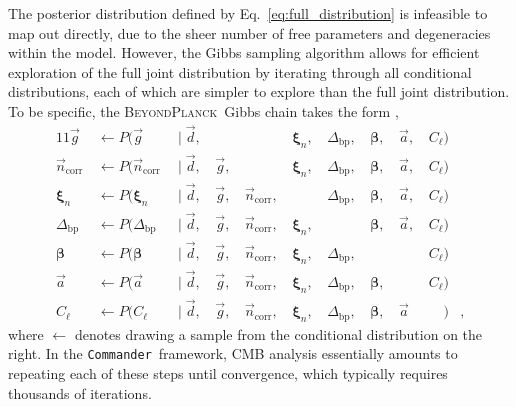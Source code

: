 \documentclass[twocolumn]{aa}
\def\commander{\texttt{Commander}}
\renewcommand{\d}[0]{\vec{d}}
\renewcommand{\a}[0]{\vec{a}}
\newcommand{\g}[0]{\vec{g}}
\newcommand{\BP}{\textsc{BeyondPlanck}}
\newcommand{\ncorr}{\vec n_\mathrm{corr}}
\newcommand{\Dbp}{\Delta_\mathrm{bp}}
\begin{document}
The posterior distribution defined by Eq.~\eqref{eq:full_distribution} is
infeasible to map out directly, due to the sheer number of free parameters and
degeneracies within the model. However, the Gibbs sampling algorithm
\citep{gelman:1992} allows for efficient exploration of the full joint
distribution by iterating through all conditional distributions, each of
which are simpler to explore than the full joint distribution. To be specific,
the \BP\ Gibbs chain takes the form \citep{bp01},
\begin{alignat}{11}
\label{eq:gain_samp_dist}\g &\,\leftarrow          P(\g&\,               \mid \d, &\,    &          &\,\boldsymbol\xi_n,  &\,\Dbp, &\,\boldsymbol\beta, &\,\a, &\,C_{\ell})\\
\label{eq:ncorr_samp_dist} \ncorr &\,\leftarrow    P(\ncorr&\,           \mid \d, &\,\g, &\,        &\,\boldsymbol\xi_n,  &\,\Dbp, &\,\boldsymbol\beta, &\,\a, &\,C_{\ell})\\ 
\label{eq:xi_samp_dist} \boldsymbol\xi_n &\,\leftarrow        P(\boldsymbol\xi_n&\,            \mid \d, &\,\g, &\,\ncorr, &\,        &\,\Dbp, &\,\boldsymbol\beta, &\,\a, &\,C_{\ell})\\
\Dbp &\,\leftarrow                                 P(\Dbp&\,             \mid \d, &\,\g, &\,\ncorr, &\,\boldsymbol\xi_n,  &\,      &\,\boldsymbol\beta, &\,\a, &\,C_{\ell})\\
\boldsymbol\beta &\,\leftarrow                     P(\boldsymbol\beta&\, \mid \d, &\,\g, &\,\ncorr, &\,\boldsymbol\xi_n,  &\,\Dbp, &\,       &\,    &\,C_{\ell})\\
\a &\,\leftarrow                                   P(\a&\,               \mid \d, &\,\g, &\,\ncorr, &\,\boldsymbol\xi_n,  &\,\Dbp, &\,\boldsymbol\beta, &\,    &\,C_{\ell})\\
C_{\ell} &\,\leftarrow                             P(C_{\ell}&\,         \mid \d, &\,\g, &\,\ncorr, &\,\boldsymbol\xi_n,  &\,\Dbp, &\,\boldsymbol\beta, &\,\a \phantom{,}&\,\phantom{C_{\ell}})&\label{eq:cl_sampling},
\end{alignat}
where $\leftarrow$ denotes drawing a sample from the conditional
distribution on the right. In the \commander\ framework, CMB analysis essentially
amounts to repeating each of these steps until convergence, which typically
requires thousands of iterations. 
\end{document}
